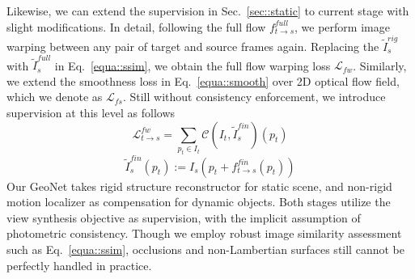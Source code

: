 \documentclass[10pt,twocolumn,letterpaper]{article}
\begin{document}
Likewise, we can extend the supervision in Sec.~\ref{sec::static} to current stage with slight modifications. In detail, following the full flow $f^{full}_{t\to s}$, we perform image warping between any pair of target and source frames again. Replacing the $\tilde{I}_s^{rig}$ with $\tilde{I}_s^{full}$ in Eq.~\eqref{equa::ssim}, we obtain the full flow warping loss $\mathcal{L}_{fw}$. Similarly, we extend the smoothness loss in Eq.~\eqref{equa::smooth} over 2D optical flow field, which we denote as $\mathcal{L}_{fs}$. %
Still without consistency enforcement, we introduce supervision at this level as follows
\begin{equation}
\mathcal{L}_{t\to s}^{fw}=\sum_{p_t\in I_t}\mathcal{C}(I_t, \tilde{I}_s^{fin})(p_t)
\end{equation}\begin{equation}
\tilde{I}_s^{fin}(p_t):=I_s(p_t+f_{t\to s}^{fin}(p_t))
\end{equation}\fi%
Our GeoNet takes rigid structure reconstructor for static scene, and non-rigid motion localizer as compensation for dynamic objects. Both stages utilize the view synthesis objective as supervision, with the implicit assumption of photometric consistency. Though we employ robust image similarity assessment such as Eq.~\eqref{equa::ssim}, occlusions and non-Lambertian surfaces still cannot be perfectly handled in practice.
\end{document}
